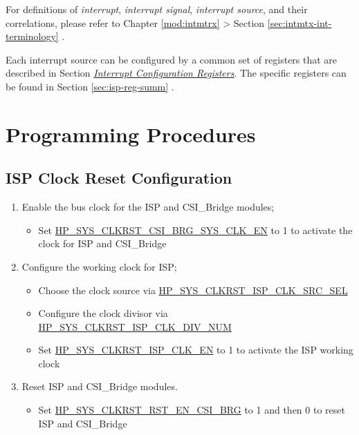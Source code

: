 \documentclass[main\_\_EN.tex]{subfiles}
\begin{document}
\begin{tiplisting}
For definitions of \textit{interrupt}, \textit{interrupt signal}, \textit{interrupt source}, and their correlations, please refer to Chapter \ref{mod:intmtrx} \textit{} > Section \ref{sec:intmtx-int-terminology} \textit{}.
\end{tiplisting}


Each interrupt source can be configured by a common set of registers that are described in Section \hyperref[interrupt-config-registers]{\textit{Interrupt Configuration Registers}}. The specific registers can be found in Section \ref{sec:isp-reg-summ} \textit{}.



\section{Programming Procedures}
\label{sec:isp-prog-procedures}


\subsection{ISP Clock Reset Configuration}
\label{sec:isp_clkrst_proc}
\begin{enumerate}
    \item Enable the bus clock for the ISP and CSI\_Bridge modules;
    \begin{itemize}
        \item Set \hyperref[fielddesc:HPSYSCLKRSTCSIBRGSYSCLKEN]{HP\_SYS\_CLKRST\_CSI\_BRG\_SYS\_CLK\_EN} to 1 to activate the clock for ISP and CSI\_Bridge
    \end{itemize}
    \item Configure the working clock for ISP;
    \begin{itemize}
        \item Choose the clock source via \hyperref[fielddesc:HPSYSCLKRSTISPCLKSRCSEL]{HP\_SYS\_CLKRST\_ISP\_CLK\_SRC\_SEL}
        \item Configure the clock divisor via \hyperref[fielddesc:HPSYSCLKRSTISPCLKDIVNUM]{HP\_SYS\_CLKRST\_ISP\_CLK\_DIV\_NUM}
        \item Set \hyperref[fielddesc:HPSYSCLKRSTISPCLKEN]{HP\_SYS\_CLKRST\_ISP\_CLK\_EN} to 1 to activate the ISP working clock
    \end{itemize}
    \item Reset ISP and CSI\_Bridge modules.
    \begin{itemize}
        \item Set \hyperref[fielddesc:HPSYSCLKRSTRSTENCSIBRG]{HP\_SYS\_CLKRST\_RST\_EN\_CSI\_BRG} to 1 and then 0 to reset ISP and CSI\_Bridge
    \end{itemize}
\end{enumerate}
\end{document}

